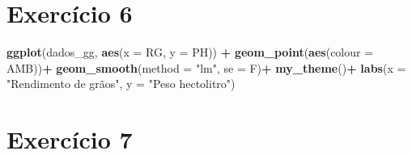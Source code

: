 \documentclass[
]{book}
\newenvironment{Shaded}{\begin{snugshade}}{\end{snugshade}}
\newcommand{\DataTypeTok}[1]{\textcolor[rgb]{0.13,0.29,0.53}{#1}}
\newcommand{\KeywordTok}[1]{\textcolor[rgb]{0.13,0.29,0.53}{\textbf{#1}}}
\newcommand{\NormalTok}[1]{#1}
\newcommand{\OperatorTok}[1]{\textcolor[rgb]{0.81,0.36,0.00}{\textbf{#1}}}
\newcommand{\StringTok}[1]{\textcolor[rgb]{0.31,0.60,0.02}{#1}}
\numberwithin{equation}{section}
\begin{document}
\hypertarget{exerc6}{%
\section{Exercício 6}\label{exerc6}}

\begin{Shaded}
\begin{Highlighting}[]
\KeywordTok{ggplot}\NormalTok{(dados\_gg, }\KeywordTok{aes}\NormalTok{(}\DataTypeTok{x =}\NormalTok{ RG, }\DataTypeTok{y =}\NormalTok{ PH)) }\OperatorTok{+}
\StringTok{     }\KeywordTok{geom\_point}\NormalTok{(}\KeywordTok{aes}\NormalTok{(}\DataTypeTok{colour =}\NormalTok{ AMB))}\OperatorTok{+}
\StringTok{     }\KeywordTok{geom\_smooth}\NormalTok{(}\DataTypeTok{method =} \StringTok{"lm"}\NormalTok{, }\DataTypeTok{se =}\NormalTok{ F)}\OperatorTok{+}
\StringTok{     }\KeywordTok{my\_theme}\NormalTok{()}\OperatorTok{+}
\StringTok{     }\KeywordTok{labs}\NormalTok{(}\DataTypeTok{x =} \StringTok{"Rendimento de grãos"}\NormalTok{, }\DataTypeTok{y =} \StringTok{"Peso hectolitro"}\NormalTok{)}
  
\end{Highlighting}
\end{Shaded}

\hypertarget{exerc7}{%
\section{Exercício 7}\label{exerc7}}
\end{document}

